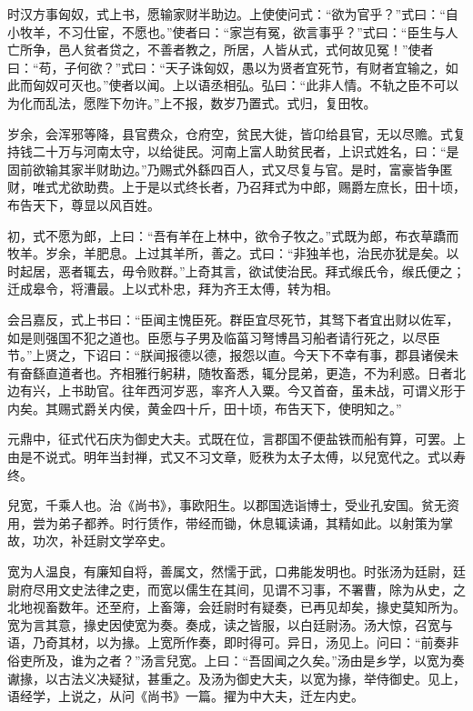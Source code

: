 \documentclass[12pt,UTF8]{ctexbook}
\begin{document}
时汉方事匈奴，式上书，愿输家财半助边。上使使问式：“欲为官乎？”式曰：“自小牧羊，不习仕宦，不愿也。”使者曰：“家岂有冤，欲言事乎？”式曰：“臣生与人亡所争，邑人贫者贷之，不善者教之，所居，人皆从式，式何故见冤！”使者曰：“苟，子何欲？”式曰：“天子诛匈奴，愚以为贤者宜死节，有财者宜输之，如此而匈奴可灭也。”使者以闻。上以语丞相弘。弘曰：“此非人情。不轨之臣不可以为化而乱法，愿陛下勿许。”上不报，数岁乃置式。式归，复田牧。



岁余，会浑邪等降，县官费众，仓府空，贫民大徙，皆卬给县官，无以尽赡。式复持钱二十万与河南太守，以给徙民。河南上富人助贫民者，上识式姓名，曰：“是固前欲输其家半财助边。”乃赐式外繇四百人，式又尽复与官。是时，富豪皆争匿财，唯式尤欲助费。上于是以式终长者，乃召拜式为中郎，赐爵左庶长，田十顷，布告天下，尊显以风百姓。



初，式不愿为郎，上曰：“吾有羊在上林中，欲令子牧之。”式既为郎，布衣草蹻而牧羊。岁余，羊肥息。上过其羊所，善之。式曰：“非独羊也，治民亦犹是矣。以时起居，恶者辄去，毋令败群。”上奇其言，欲试使治民。拜式缑氏令，缑氏便之；迁成皋令，将漕最。上以式朴忠，拜为齐王太傅，转为相。



会吕嘉反，式上书曰：“臣闻主愧臣死。群臣宜尽死节，其驽下者宜出财以佐军，如是则强国不犯之道也。臣愿与子男及临菑习弩博昌习船者请行死之，以尽臣节。”上贤之，下诏曰：“朕闻报德以德，报怨以直。今天下不幸有事，郡县诸侯未有奋繇直道者也。齐相雅行躬耕，随牧畜悉，辄分昆弟，更造，不为利惑。日者北边有兴，上书助官。往年西河岁恶，率齐人入粟。今又首奋，虽未战，可谓义形于内矣。其赐式爵关内侯，黄金四十斤，田十顷，布告天下，使明知之。”



元鼎中，征式代石庆为御史大夫。式既在位，言郡国不便盐铁而船有算，可罢。上由是不说式。明年当封禅，式又不习文章，贬秩为太子太傅，以兒宽代之。式以寿终。



兒宽，千乘人也。治《尚书》，事欧阳生。以郡国选诣博士，受业孔安国。贫无资用，尝为弟子都养。时行赁作，带经而锄，休息辄读诵，其精如此。以射策为掌故，功次，补廷尉文学卒史。



宽为人温良，有廉知自将，善属文，然懦于武，口弗能发明也。时张汤为廷尉，廷尉府尽用文史法律之吏，而宽以儒生在其间，见谓不习事，不署曹，除为从史，之北地视畜数年。还至府，上畜簿，会廷尉时有疑奏，已再见却矣，掾史莫知所为。宽为言其意，掾史因使宽为奏。奏成，读之皆服，以白廷尉汤。汤大惊，召宽与语，乃奇其材，以为掾。上宽所作奏，即时得可。异日，汤见上。问曰：“前奏非俗吏所及，谁为之者？”汤言兒宽。上曰：“吾固闻之久矣。”汤由是乡学，以宽为奏谳掾，以古法义决疑狱，甚重之。及汤为御史大夫，以宽为掾，举侍御史。见上，语经学，上说之，从问《尚书》一篇。擢为中大夫，迁左内史。
\end{document}
